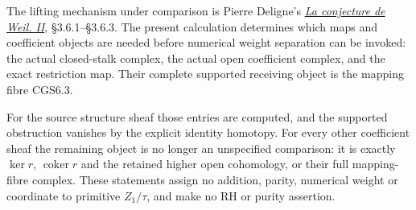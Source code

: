 The lifting mechanism under comparison is Pierre Deligne's
\href{https://www.numdam.org/item/PMIHES_1980__52__137_0/}{\emph{La
conjecture de Weil. II}}, §3.6.1--§3.6.3. The present calculation
determines which maps and coefficient objects are needed before
numerical weight separation can be invoked: the actual closed-stalk
complex, the actual open coefficient complex, and the exact restriction
map. Their complete supported receiving object is the mapping fibre
CGS6.3.

For the source structure sheaf those entries are computed, and the
supported obstruction vanishes by the explicit identity homotopy. For
every other coefficient sheaf the remaining object is no longer an
unspecified comparison: it is exactly \(\ker r\),
\(\operatorname{coker}r\) and the retained higher open cohomology, or
their full mapping-fibre complex. These statements assign no addition,
parity, numerical weight or coordinate to primitive \(Z_1/\tau\), and
make no RH or purity assertion.
